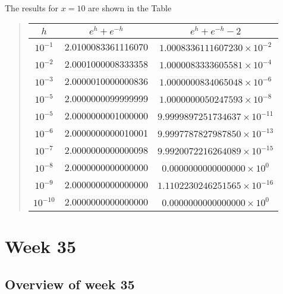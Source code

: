 \documentclass[%
twoside,                 %
final,                   %
10pt]{article}
\newenvironment{paragraphadmon}[1][]{\paragraph{#1}}{}
\begin{document}
\begin{paragraphadmon}[]
The results for $x=10$ are shown in the Table


\begin{quote}
\begin{tabular}{ccc}
\hline
\multicolumn{1}{c}{ $h$ } & \multicolumn{1}{c}{ $e^{h}+e^{-h}$ } & \multicolumn{1}{c}{ $e^{h}+e^{-h}-2$ } \\
\hline
$10^{-1}$                           & 2.0100083361116070                  & $1.0008336111607230\times 10^{-2}$  \\
$10^{-2}$                           & 2.0001000008333358                  & $1.0000083333605581\times 10^{-4}$  \\
$10^{-3}$                           & 2.0000010000000836                  & $1.0000000834065048\times 10^{-6}$  \\
$10^{-5}$                           & 2.0000000099999999                  & $1.0000000050247593\times 10^{-8}$  \\
$10^{-5}$                           & 2.0000000001000000                  & $9.9999897251734637\times 10^{-11}$ \\
$10^{-6}$                           & 2.0000000000010001                  & $9.9997787827987850\times 10^{-13}$ \\
$10^{-7}$                           & 2.0000000000000098                  & $9.9920072216264089\times 10^{-15}$ \\
$10^{-8}$                           & 2.0000000000000000                  & $0.0000000000000000\times 10^{0}$   \\
$10^{-9}$                           & 2.0000000000000000                  & $1.1102230246251565\times 10^{-16}$ \\
$10^{-10}$                          & 2.0000000000000000                  & $0.0000000000000000\times 10^{0}$   \\
\hline
\end{tabular}
\end{quote}

\noindent
\end{paragraphadmon}




\section{Week 35}

\subsection{Overview of week 35}
\end{document}
